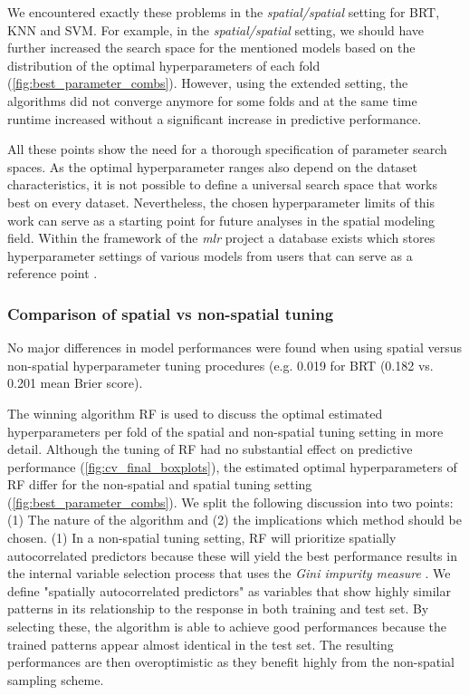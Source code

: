 \documentclass[review]{elsarticle}
\begin{document}
We encountered exactly these problems in the \emph{spatial/spatial} setting for BRT, KNN and SVM.
For example, in the \emph{spatial/spatial} setting, we should have further increased the search space for the mentioned models based on the distribution of the optimal hyperparameters of each fold (\autoref{fig:best_parameter_combs}).
However, using the extended setting, the algorithms did not converge anymore for some folds and at the same time runtime increased without a significant increase in predictive performance.

All these points show the need for a thorough specification of parameter search spaces.
As the optimal hyperparameter ranges also depend on the dataset characteristics, it is not possible to define a universal search space that works best on every dataset.
Nevertheless, the chosen hyperparameter limits of this work can serve as a starting point for future analyses in the spatial modeling field.
Within the framework of the \textit{mlr} project a database exists which stores hyperparameter settings of various models from users that can serve as a reference point \citep{mlrhyperopt}.

\subsubsection{Comparison of spatial vs non-spatial tuning}
No major differences in model performances were found when using spatial versus non-spatial hyperparameter tuning procedures (e.g. 0.019 for \ac{BRT} (0.182 vs. 0.201 mean Brier score).

The winning algorithm RF is used to discuss the optimal estimated hyperparameters per fold of the spatial and non-spatial tuning setting in more detail.
Although the tuning of RF had no substantial effect on predictive performance (\autoref{fig:cv_final_boxplots}), the estimated optimal hyperparameters of RF differ for the non-spatial and spatial tuning setting (\autoref{fig:best_parameter_combs}).
We split the following discussion into two points: (1) The nature of the algorithm and (2) the implications which method should be chosen.
(1) In a non-spatial tuning setting, RF will prioritize spatially autocorrelated predictors because these will yield the best performance results in the internal variable selection process that uses the \textit{Gini impurity measure} \citep{Biau2016, Gordon1984}. 
We define "spatially autocorrelated predictors" as variables that show highly similar patterns in its relationship to the response in both training and test set.
By selecting these, the algorithm is able to achieve good performances because the trained patterns appear almost identical in the test set. 
The resulting performances are then overoptimistic as they benefit highly from the non-spatial sampling scheme.
\end{document}

